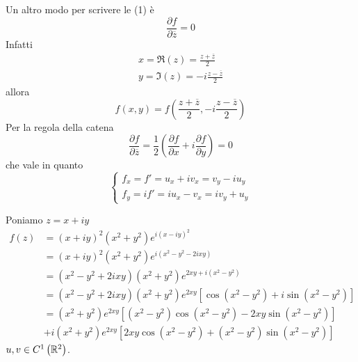 \begin{rem}
Un altro modo per scrivere le (1) è
\begin{equation*}
\frac{\partial f}{\partial \overline{z}} = 0
\end{equation*}
Infatti
\begin{equation*}
\begin{array}{l}
x = \Re \left(z\right) = \frac{z + \overline{z}}{2}\\
y = \Im \left(z\right) = - i\frac{z - \overline{z}}{2}
\end{array}
\end{equation*}
allora
\begin{equation*}
f\left(x, y\right) = f\left(\frac{z + \overline{z}}{2}, - i\frac{z - \overline{z}}{2}\right)
\end{equation*}
Per la regola della catena
\begin{equation*}
\frac{\partial f}{\partial \overline{z}} = \frac{1}{2}\left(\frac{\partial f}{\partial x} + i\frac{\partial f}{\partial y}\right) = 0
\end{equation*}
che vale in quanto
\begin{equation*}
\begin{cases}
f_{x} = f' = u_{x} + iv_{x} = v_{y} - iu_{y}\\
f_{y} = if' = iu_{x} - v_{x} = iv_{y} + u_{y}
\end{cases}
\end{equation*}
\end{rem}
Poniamo $z = x + iy$
\begin{align*}
f\left(z\right) & = \left(x + iy\right)^{2}\left(x^{2} + y^{2}\right) e^{i\left(x - iy\right)^{2}}\\
 & = \left(x + iy\right)^{2}\left(x^{2} + y^{2}\right) e^{i\left(x^{2} - y^{2} - 2ixy\right)}\\
 & = \left(x^{2} - y^{2} + 2ixy\right)\left(x^{2} + y^{2}\right) e^{2xy + i\left(x^{2} - y^{2}\right)}\\
 & = \left(x^{2} - y^{2} + 2ixy\right)\left(x^{2} + y^{2}\right) e^{2xy}\left[\cos\left(x^{2} - y^{2}\right) + i\sin\left(x^{2} - y^{2}\right)\right]\\
 & = \left(x^{2} + y^{2}\right) e^{2xy}\left[\left(x^{2} - y^{2}\right)\cos\left(x^{2} - y^{2}\right) - 2xy\sin\left(x^{2} - y^{2}\right)\right]\\
 & + i\left(x^{2} + y^{2}\right) e^{2xy}\left[ 2xy\cos\left(x^{2} - y^{2}\right) + \left(x^{2} - y^{2}\right)\sin\left(x^{2} - y^{2}\right)\right]
\end{align*}
$u, v\in C^{1}\left(\mathbb{R}^{2}\right)$.

